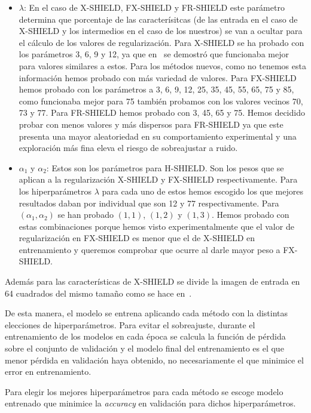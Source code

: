 \begin{itemize}

\item $\lambda$: En el caso de X-SHIELD, FX-SHIELD y FR-SHIELD este parámetro determina que porcentaje de las caracterísitcas (de las entrada en el caso de X-SHIELD y los intermedios en el caso de los nuestros) se van a ocultar para el cálculo de los valores de regularización. Para X-SHIELD se ha probado con los parámetros 3, 6, 9 y 12, ya que en~\cite{XSHIELD} se demostró que funcionaba mejor para valores similares a estos. Para los métodos nuevos, como no tenemos esta información hemos probado con más variedad de valores. Para FX-SHIELD hemos probado con los parámetros a 3, 6, 9, 12, 25, 35, 45, 55, 65, 75 y 85, como funcionaba mejor para 75 también probamos con los valores vecinos 70, 73 y 77. Para FR-SHIELD hemos probado con 3, 45, 65 y 75. Hemos decidido probar con menos valores y más dispersos para FR-SHIELD ya que este presenta una mayor aleatoriedad en su comportamiento experimental y una exploración más fina eleva el riesgo de sobreajustar a ruido.

\item $\alpha_1$ y $ \alpha_2$: Estos son los parámetros para H-SHIELD. Son los pesos que se aplican a la regularización X-SHIELD y FX-SHIELD respectivamente. Para los hiperparámetros $\lambda$ para cada uno de estos hemos escogido los que mejores resultados daban por individual que son 12 y 77 respectivamente. Para $(\alpha_1,\alpha_2)$ se han probado $(1,1)$, $(1,2)$ y $(1,3)$. Hemos probado con estas combinaciones porque hemos visto experimentalmente que el valor de regularización en FX-SHIELD es menor que el de X-SHIELD en entrenamiento y queremos comprobar que ocurre al darle mayor peso a FX-SHIELD.
\end{itemize}

Además para las características de X-SHIELD se divide la imagen de entrada en 64 cuadrados del mismo tamaño como se hace en~\cite{XSHIELD}.

De esta manera, el modelo se entrena aplicando cada método con la distintas elecciones de hiperparámetros. Para evitar el sobreajuste, durante el entrenamiento de los modelos en cada época se calcula la función de pérdida sobre el conjunto de validación y el modelo final del entrenamiento es el que menor pérdida en validación haya obtenido, no necesariamente el que minimice el error en entrenamiento. 

Para elegir los mejores hiperparámetros para cada método se escoge modelo entrenado que minimice la \textit{accuracy} en validación para dichos hiperparámetros.


